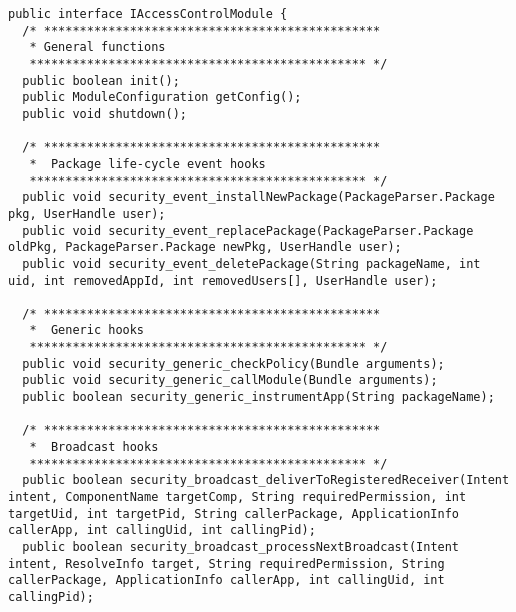 \documentclass[letterpaper,twocolumn,10pt]{article}
\begin{document}
\begin{lstlisting}[emph={},basicstyle=\footnotesize,caption={Interface for Access Control Policy Modules}]
public interface IAccessControlModule {
  /* ***********************************************
   * General functions
   *********************************************** */
  public boolean init();
  public ModuleConfiguration getConfig();
  public void shutdown();
  
  /* ***********************************************
   *  Package life-cycle event hooks
   *********************************************** */
  public void security_event_installNewPackage(PackageParser.Package pkg, UserHandle user);
  public void security_event_replacePackage(PackageParser.Package oldPkg, PackageParser.Package newPkg, UserHandle user);
  public void security_event_deletePackage(String packageName, int uid, int removedAppId, int removedUsers[], UserHandle user);
  
  /* ***********************************************
   *  Generic hooks
   *********************************************** */
  public void security_generic_checkPolicy(Bundle arguments);
  public void security_generic_callModule(Bundle arguments);
  public boolean security_generic_instrumentApp(String packageName);

  /* ***********************************************
   *  Broadcast hooks
   *********************************************** */
  public boolean security_broadcast_deliverToRegisteredReceiver(Intent intent, ComponentName targetComp, String requiredPermission, int targetUid, int targetPid, String callerPackage, ApplicationInfo callerApp, int callingUid, int callingPid);
  public boolean security_broadcast_processNextBroadcast(Intent intent, ResolveInfo target, String requiredPermission, String callerPackage, ApplicationInfo callerApp, int callingUid, int callingPid);
  

\end{lstlisting}
\end{document}
